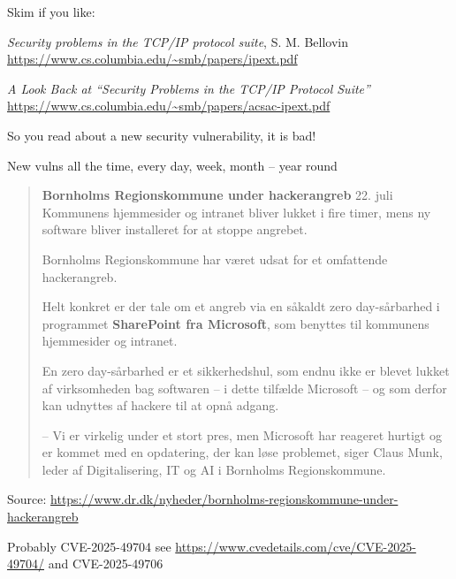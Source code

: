 \documentclass[Screen16to9,17pt]{foils}
\begin{document}
Skim if you like:
\begin{list2}
\item
\emph{Security problems in the TCP/IP protocol suite}, S. M. Bellovin \url{https://www.cs.columbia.edu/~smb/papers/ipext.pdf}
\item \emph{A Look Back at “Security Problems in the TCP/IP Protocol Suite”} \url{https://www.cs.columbia.edu/~smb/papers/acsac-ipext.pdf}
\end{list2}


So you read about a new security vulnerability, it is bad!
\begin{list2}
\item New vulns all the time, every day, week, month -- year round
\end{list2}



\begin{quote}
{\bf\large Bornholms Regionskommune under hackerangreb} 22. juli\\
Kommunens hjemmesider og intranet bliver lukket i fire timer, mens ny software bliver installeret for at stoppe angrebet.

Bornholms Regionskommune har været udsat for et omfattende hackerangreb.

Helt konkret er der tale om et angreb via en såkaldt zero day-sårbarhed i programmet {\bf SharePoint fra Microsoft}, som benyttes til kommunens hjemmesider og intranet.

En zero day-sårbarhed er et sikkerhedshul, som endnu ikke er blevet lukket af virksomheden bag softwaren – i dette tilfælde Microsoft – og som derfor kan udnyttes af hackere til at opnå adgang.

– Vi er virkelig under et stort pres, men Microsoft har reageret hurtigt og er kommet med en opdatering, der kan løse problemet, siger Claus Munk, leder af Digitalisering, IT og AI i Bornholms Regionskommune.
\end{quote}
Source: \url{https://www.dr.dk/nyheder/bornholms-regionskommune-under-hackerangreb}
\begin{list2}
\item Probably CVE-2025-49704 see \url{https://www.cvedetails.com/cve/CVE-2025-49704/} and CVE-2025-49706
\end{list2}


\end{document}

